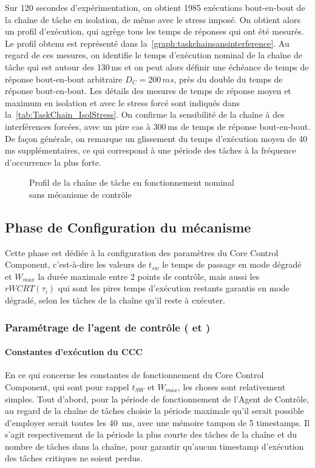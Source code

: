 \documentclass[french, a4paper, 11pt, twoside, pdftex]{StyleThese}
\begin{document}
Sur 120 secondes d'expérimentation, on obtient 1985 exécutions bout-en-bout de la chaîne de tâche en isolation, de même avec le stress imposé. On obtient alors un profil d'exécution, qui agrège tous les temps de réponses qui ont été mesurés. Le profil obtenu est représenté dans la~\autoref{graph:taskchainsansinterference}. Au regard de ces mesures, on identifie le temps d'exécution nominal de la chaîne de tâche qui est autour des 130\,ms et on peut alors définir une échéance de temps de réponse bout-en-bout arbitraire $D_C = 200\,ms$, près du double du temps de réponse bout-en-bout. Les détails des mesures de temps de réponse moyen et maximum en isolation et avec le stress forcé sont indiqués dans la~\autoref{tab:TaskChain_IsolStress}. On confirme la sensibilité de la chaîne à des interférences forcées, avec un pire cas à 300\,ms de temps de réponse bout-en-bout. De façon générale, on remarque un glissement du temps d'exécution moyen de 40\,ms supplémentaires, ce qui correspond à une période des tâches à la fréquence d’occurrence la plus forte.

\begin{figure}[ht]
	\centering
	\scalebox{0.9}{}
	\captionsetup{justification=centering}
	\caption{Profil de la chaîne de tâche en fonctionnement nominal \\ sans mécanisme de contrôle}
	\label{graph:taskchainsansinterference}
\end{figure}

\subsection{Phase de Configuration du mécanisme}

Cette phase est dédiée à la configuration des paramètres du Core Control Component, c'est-à-dire les valeurs de $t_{sw}$ le temps de passage en mode dégradé et $W_{max}$ la durée maximale entre 2 points de contrôle, mais aussi les $rWCRT(\tau_i)$ qui sont les pires temps d'exécution restants garantis en mode dégradé, selon les tâches de la chaîne qu'il reste à exécuter.

\subsubsection{Paramétrage de l'agent de contrôle ( et )}

\paragraph{Constantes d'exécution du CCC}
En ce qui concerne les constantes de fonctionnement du Core Control Component, qui sont pour rappel $t_{SW}$ et $W_{max}$, les choses sont relativement simples. Tout d'abord, pour la période de fonctionnement de l'Agent de Contrôle, au regard de la chaîne de tâches choisie la période maximale qu'il serait possible d'employer serait toutes les 40~ms, avec une mémoire tampon de 5 timestamps. Il s'agit respectivement de la période la plus courte des tâches de la chaîne et du nombre de tâches dans la chaîne, pour garantir qu'aucun timestamp d'exécution des tâches critiques ne soient perdus.
\end{document}
